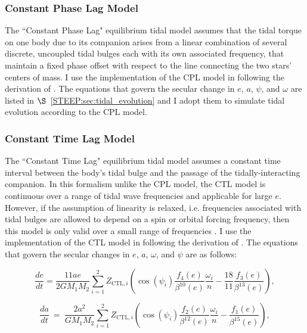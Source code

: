 \subsubsection{Constant Phase Lag Model}

The ``Constant Phase Lag" \citep[CPL,][]{FerrazMello2008,Heller2011} equilibrium tidal model assumes that the tidal torque on one body due to its companion arises from a linear combination of several discrete, uncoupled tidal bulges each with its own associated frequency, that maintain a fixed phase offset with respect to the line connecting the two stars' centers of mass. I use the \eqtide implementation of the CPL model in \vplanet following the derivation of \citet{FerrazMello2008}.  The equations that govern the secular change in $e$, $a$, $\psi$, and $\omega$ are listed in $\S$~\ref{STEEP:sec:tidal_evolution} and I adopt them to simulate tidal evolution according to the CPL model.

\subsubsection{Constant Time Lag Model}

The ``Constant Time Lag" \citep[CTL,][]{Hut1981,Leconte2010} equilibrium tidal model assumes a constant time interval between the body's tidal bulge and the passage of the tidally-interacting companion. In this formalism unlike the CPL model, the CTL model is continuous over a range of tidal wave frequencies and applicable for large $e$.  However, if the assumption of linearity is relaxed, i.e. frequencies associated with tidal bulges are allowed to depend on a spin or orbital forcing frequency, then this model is only valid over a small range of frequencies \citep{Greenberg2009}. I use the \eqtide implementation of the CTL model in \vplanet following the derivation of \citet{Leconte2010}.  The equations that govern the secular changes in $e$, $a$, $\omega$, and $\psi$ are as follows:

\begin{equation} \label{sync:eqn:ctl:e}
  \frac{de}{dt} = \frac{11 ae}{2 G M_1 M_2}
  \sum_{i = 1}^2 Z_{\mathrm{CTL},i} \left( \cos(\psi_i) \frac{f_4(e)}{\beta^{10}(e)}  \frac{\omega_i}{n} -\frac{18}{11} \frac{f_3(e)}{\beta^{13}(e)}\right),
\end{equation}

\small
\begin{equation}\label{sync:eqn:ctl:a}
  \frac{da}{dt} \ = \  \frac{2 a^2}{G M_1 M_2}
  \sum\limits_{i = 1}^2 Z_{\mathrm{CTL},i} \left( \cos(\psi_i) \frac{f_2(e)}{\beta^{12}(e)} \frac{\omega_i}{n} - \frac{f_1(e)}{\beta^{15}(e)}\right),
\end{equation}

